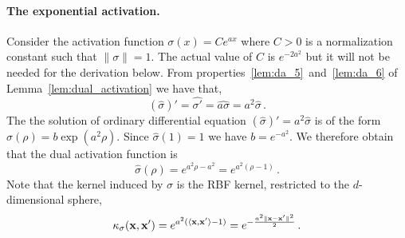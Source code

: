 \paragraph*{The exponential activation.}
Consider the activation function $\sigma(x)=Ce^{ax}$ where $C>0$ is a
normalization constant such that $\|\sigma\|=1$. The actual value of $C$ is
$e^{-2a^2}$ but it will not be needed for the derivation below. From
properties~\ref{lem:da_5}~and~\ref{lem:da_6} of
Lemma~\ref{lem:dual_activation} we have that,
$$
\left(\hat{\sigma}\right)' = \widehat{\sigma'} =
	\widehat{a \sigma} = a^2 \hat{\sigma} \,.
$$
The the solution of ordinary differential equation
$\left(\hat{\sigma}\right)' =  a^2 \hat{\sigma}$ is of the form
$\hat{\sigma}(\rho) = b \exp\left(a^2 \rho\right)$. Since $\hat\sigma(1) = 1$
we have $b=e^{-a^2}$. We therefore obtain that the dual activation
function is
$$
\hat\sigma(\rho) = e^{a^2 \rho - a^2} = e^{a^2 (\rho - 1)} \,.
$$
Note that the kernel induced by $\sigma$ is the RBF kernel, restricted to the
$d$-dimensional sphere,
$$\kappa_\sigma ({\mathbf x},{\mathbf x}') =
e^{a^2(\langle {\mathbf x},{\mathbf x}' \rangle-1)} = e^{-\frac{a^2\|{\mathbf x}-{\mathbf x}'\|^2 }{2}} \,.$$

\iffalse
\paragraph*{The exponential activation.} Consider the activation
$\sigma(x)={e^{ax}}/{e^{2a^2}}$. We have
\[
e^{2a^2}\hat \sigma (\rho) =
  \E_{(X,Y)\sim\gaussian_{\rho}}e^{aX}e^{aY} =
  \E_{(X,Y)\sim\gaussian_{\rho}}e^{a(X+Y)}\,.
\]
Now, $X+Y$ is a normal variable with expectation $0$ and variance $2+2\rho$.
Since the moment generating function on a standard Gaussian is
$e^{\frac{t^2}{2}}$, it follows  that $e^{2a^2}\hat \sigma (\rho) =
e^{a^2(1+\rho)}$. We note that the kernel induced by $\sigma$ is the RBF
kernel, restricted to the sphere,
$$\kappa_\sigma (\x,\x') =
e^{-2a^2}e^{a^2(1+\inner{\x,\x'})} = e^{-\frac{a^2\|\x-\x'\|^2 }{2}} \,.$$
\fi

